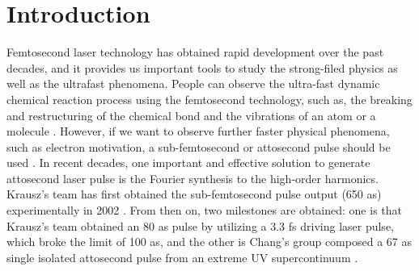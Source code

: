 \documentclass[10pt,letterpaper]{article}
\begin{document}
\section{Introduction}
Femtosecond laser technology has obtained rapid development over the past decades, and it provides us important tools to study the strong-filed physics as well as the ultrafast phenomena. People can observe the ultra-fast dynamic chemical reaction process using the femtosecond technology, such as, the breaking and restructuring of the chemical bond \cite{Mokhtari-chemical-bond-Nature-1990} and the vibrations of an atom or a molecule \cite{Ergler-Vibration-PRL-2006}. However, if we want to observe further faster physical phenomena, such as electron motivation, a sub-femtosecond or attosecond pulse should be used \cite{Uiberacker-Attosecond-real-time-Nature-2007}. In recent decades, one important and effective solution to generate attosecond laser pulse is the Fourier synthesis to the high-order harmonics. Krausz's team has first obtained the sub-femtosecond pulse output (650 as) experimentally in 2002 \cite{Krausz-Attosecon-Review-2009}. From then on, two milestones are obtained: one is that Krausz's team \cite{Krausz-Attosecon-Review-2009} obtained an 80 as pulse by utilizing a 3.3 fs driving laser pulse, which broke the limit of 100 as, and the other is Chang's group composed a 67 as single isolated attosecond pulse from an extreme UV supercontinuum \cite{Chang2012-OL-67as}.
\end{document}
